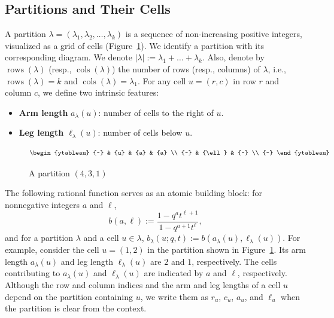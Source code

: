 \documentclass{article}
\theoremstyle{plain}
\theoremstyle{definition}
\theoremstyle{remark}
\newcommand\rows{\operatorname{rows}}
\newcommand\cols{\operatorname{cols}}
\begin{document}
	\subsection{Partitions and Their Cells}
	A partition $\lambda = (\lambda_1, \lambda_2, \dots, \lambda_k)$ is a sequence of non-increasing positive integers, visualized as a grid of cells (Figure~\ref{fig:partition}). We identify a partition with its corresponding diagram. We denote $|\lambda| := \lambda_1+\dots+\lambda_k$.
    Also, denote by $\rows(\lambda)$ (resp., $\cols(\lambda)$) the number of rows (resp., columns)
    of $\lambda$, i.e., $\rows(\lambda) = k$ and $\cols(\lambda)=\lambda_1$.
    For any cell $u = (r, c)$ in row $r$ and column $c$, we define two intrinsic features:
	\begin{itemize}
		\item \textbf{Arm length} $a_\lambda(u)$: number of cells to the right of $u$.
        \item \textbf{Leg length} $\ell_\lambda(u)$: number of cells below $u$.
	\end{itemize}
    \begin{figure}
        \[
        \begin{ytableau}
           {~} & {u} & {a} & {a} \\
           {~} & {\ell} & {~} \\
           {~}
        \end{ytableau}
        \]
        \caption{A partition $(4,3,1)$}
        \label{fig:partition}
    \end{figure}
    The following rational function serves as an atomic building block:
    for nonnegative integers $a$ and $\ell$,
    \[
        b(a,\ell) := \frac{1-q^{a}t^{\ell+1}}{1-q^{a+1}t^{\ell}},
    \]
    and for a partition $\lambda$ and a cell $u\in\lambda$,
    \( b_\lambda(u; q,t) := b(a_\lambda(u), \ell_\lambda(u)) \).
    For example, consider the cell $u=(1,2)$ in the partition shown in Figure~\ref{fig:partition}.
    Its arm length $a_\lambda(u)$ and leg length $\ell_\lambda(u)$ are $2$ and $1$, respectively.
    The cells contributing to $a_\lambda(u)$ and $\ell_\lambda(u)$ are indicated by $a$ and $\ell$, respectively.
    Although the row and column indices and the arm and leg lengths of a cell $u$ depend on the partition containing $u$, we write them as $r_u$, $c_u$, $a_u$, and $\ell_u$ when the partition is clear from the context.
    
\end{document}
